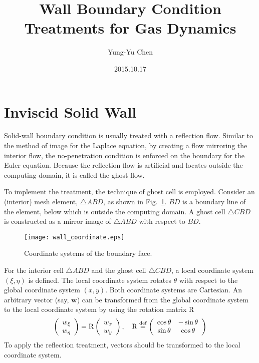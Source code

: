 \documentclass[a4paper,12pt,dvips]{article}
\newcommand*\defeq{\buildrel{\text{def}}\over{=}}
\begin{document}
\title{Wall Boundary Condition Treatments for Gas Dynamics}
\author{Yung-Yu Chen}
\date{2015.10.17}

\maketitle

\tableofcontents

\hspace{.5cm}

\section{Inviscid Solid Wall}

Solid-wall boundary condition is usually treated with a reflection
flow\cite{laney_computational_1998}.  Similar to the method of image for the
Laplace equation, by creating a flow mirroring the interior flow, the
no-penetration condition is enforced on the boundary for the Euler equation.
Because the reflection flow is artificial and locates outside the computing
domain, it is called the ghost flow.

To implement the treatment, the technique of ghost cell is employed.  Consider
an (interior) mesh element, $\bigtriangleup ABD$, as shown in
Fig.~\ref{f:wall_coordinate}.  $\overline{BD}$ is a boundary line of the
element, below which is outside the computing domain.  A ghost cell
$\bigtriangleup CBD$ is constructed as a mirror image of $\bigtriangleup ABD$
with respect to $\overline{BD}$.

\begin{figure}[htbp]
\centering
\texttt{[image: wall\_coordinate.eps]}
\caption{Coordinate systems of the boundary face.}
\label{f:wall_coordinate}
\end{figure}

For the interior cell $\bigtriangleup ABD$ and the ghost cell $\bigtriangleup
CBD$, a local coordinate system $(\xi, \eta)$ is defined.  The local coordinate
system rotates $\theta$ with respect to the global coordinate system $(x, y)$.
Both coordinate systems are Cartesian.  An arbitrary vector (say, $\mathbf{w}$)
can be transformed from the global coordinate system to the local coordinate
system by using the rotation matrix $\mathrm{R}$
\begin{align*}
\left(\begin{array}{c} w_{\xi} \\ w_{\eta} \end{array}\right)
= \mathrm{R}
\left(\begin{array}{c} w_x \\ w_y \end{array}\right), \quad
\mathrm{R} \defeq \left(\begin{array}{cc}
  \cos\theta & -\sin\theta \\ \sin\theta & \cos\theta
\end{array}\right)
\end{align*}
To apply the reflection treatment, vectors should be transformed to the local
coordinate system.
\end{document}
